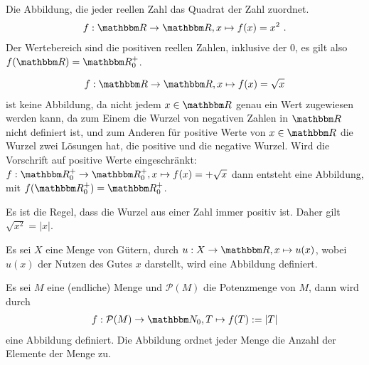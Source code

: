 \begin{Unit}[Beispiel] 
Die Abbildung, die jeder reellen Zahl das Quadrat der Zahl zuordnet.
\begin{align}
  f: \RR \rightarrow \RR, x \mapsto f(x) = x^2 \ .
\end{align}
Der Wertebereich sind die positiven reellen Zahlen, inklusive der $0$, es 
gilt also $f(\RR) = \RR^+_0$.
\end{Unit}

\begin{Unit}[Beispiel] 
  \begin{align}
    f: \RR \rightarrow \RR, x \mapsto f(x) = \sqrt{x}
  \end{align}
  ist keine Abbildung, da nicht jedem $x \in \RR$ genau ein Wert zugewiesen 
  werden kann, da zum Einem die Wurzel von negativen Zahlen in $\RR$ nicht 
  definiert ist, und zum Anderen für positive Werte von $x \in \RR$ die 
  Wurzel zwei Lösungen hat, die positive und die negative Wurzel. Wird die 
  Vorschrift auf positive Werte eingeschränkt: $f:\RR^+_0 \rightarrow 
  \RR^+_0, x \mapsto f(x) = +\sqrt{x}$ dann entsteht eine Abbildung, mit 
  $f(\RR^+_0) = \RR^+_0$.
  
  Es ist die Regel, dass die Wurzel aus einer Zahl immer positiv ist. Daher
  gilt $\sqrt{x^2} = |x|$.
\end{Unit}

\begin{Unit}[Beispiel] 
  Es sei $X$ eine Menge von Gütern, durch $u: X \rightarrow \RR, x \mapsto 
  u(x)$, wobei $u(x)$ der Nutzen des Gutes $x$ darstellt, wird eine Abbildung 
  definiert.
\end{Unit}

\begin{Unit}[Beispiel]  
  Es sei $M$ eine (endliche) Menge und $\mathcal{P}(M)$ die Potenzmenge von 
  $M$, dann wird durch
  \begin{align}
    f: \mathcal{P}(M) \rightarrow \NN_0, T \mapsto f(T) := |T|
  \end{align}
  eine Abbildung definiert. Die Abbildung ordnet jeder Menge die Anzahl der 
  Elemente der Menge zu.
\end{Unit}

